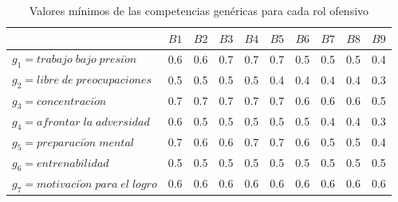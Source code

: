 \begin{table}[H]
	\caption{Valores mínimos de las competencias genéricas para cada rol ofensivo}\label{mcgo-pel}
	\centering
	\begin{tabular}{|l|c|c|c|c|c|c|c|c|c|}
		\hline
		\thead{$Z(g,r)$} & $B1$ & $B2$  & $B3$ & $B4$ & $B5$ & $B6$ & $B7$ & $B8$ & $B9$ \\ \hline
		$g_1=trabajo\;bajo\;presi\acute{o}n$ 	 & 0.6 	&  0.6 	&  0.7 &  0.7 &  0.7 &  0.5 &  0.5 & 0.5  & 0.4 \\ \hline
		$g_2=libre\;de\;preocupaciones$ 	 & 0.5  &  0.5  &  0.5 &  0.5 &  0.4 &  0.4 &  0.4 & 0.4  & 0.3 \\ \hline
		$g_3=concentraci\acute{o}n$ 	 & 0.7  &  0.7  &  0.7 &  0.7 &  0.7 &  0.6 &  0.6 & 0.6  & 0.5 \\ \hline
		$g_4=afrontar\;la\;adversidad$ 	 & 0.6  &  0.5  &  0.5 &  0.5 &  0.5 &  0.5 &  0.4 & 0.4  & 0.3 \\ \hline
		$g_5=preparaci\acute{o}n\;mental$ 	 & 0.7  &  0.6  &  0.6 &  0.7 &  0.7 &  0.6 &  0.5 & 0.5  & 0.4 \\ \hline
		$g_6=entrenabilidad$ 	 & 0.5  &  0.5  &  0.5 &  0.5 &  0.5 &  0.5 &  0.5 & 0.5  & 0.5 \\ \hline
		$g_7=motivaci\acute{o}n\;para\;el\;logro$ 	 & 0.6  &  0.6  &  0.6 &  0.6 &  0.6 &  0.6 &  0.6 & 0.6  & 0.6 \\ \hline
	\end{tabular}
\end{table}


 
